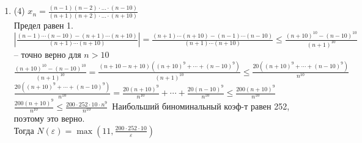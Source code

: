 \documentclass[a4paper]{article}
\def\eps{\varepsilon}
\begin{document}
\begin{enumerate}
\begin{enumerate}
        С $n > 10$ точно выполняется, что знаменатель > 1, поэтому:
        $\ 2|\frac{1 - \sqrt[3]{1 + \frac{2}{n} - \frac{1}{n^2}} + 1 - \sqrt[3]{1 - \frac{1}{n^2}} + 1 - \sqrt[3]{1 - \frac{2}{n} - \frac{1}{n^2}}}{3(\sqrt[3]{1 + \frac{2}{n} - \frac{1}{n^2}} + \sqrt[3]{1 - \frac{1}{n^2}} + \sqrt[3]{1 - \frac{2}{n} - \frac{1}{n^2}})}| \le
        2|1 - \sqrt[3]{1 + \frac{2}{n} - \frac{1}{n^2}} + 1 - \sqrt[3]{1 - \frac{1}{n^2}} + 1 - \sqrt[3]{1 - \frac{2}{n} - \frac{1}{n^2}}| \le
        2|3 - \sqrt[3]{1 + \frac{2}{n} - \frac{1}{n^2}}| \le 2|3 - \sqrt[3]{1 + \frac{2}{n} -\frac{1}{n^2}}| \le
        2|3 + \sqrt[3]{\frac{1}{n^2}}|$. $2|3 + \sqrt[3]{\frac{1}{n^2}}| < \eps \Leftrightarrow
        3 + \sqrt[3]{\frac{1}{n^2}} < \frac{\eps}{2} \Leftrightarrow \frac{1}{n^2} < (\frac{\eps}{2} - 3)^3$. При $\eps \ge \frac{3}{2}$ можно брать $n = 10$ и все будет хорошо. Дальше рассматриваем $\eps < \frac{3}{2}$
        \item (4) $x_n = \frac{(n-1)(n-2)\cdot\dots\cdot (n-10)}{(n+1)(n+2)\cdot\dots\cdot(n+10)}$\\
        Предел равен 1.\\
        $|\frac{(n-1)\cdots(n-10) - (n+1)\cdots(n+10)}{(n+1)\cdots(n+10)}| = \frac{(n+1)\cdots(n+10) - (n-1)\cdots(n-10)}{(n+1)\cdots(n+10)} \le \frac{(n+10)^{10} - (n-10)^{10}}{(n+1)^{10}}$ -- точно верно для $n > 10$\\
        $\frac{(n+10)^{10} - (n-10)^{10}}{(n+1)^{10}} = \frac{(n+10 - n + 10)((n+10)^9 + \cdots + (n-10)^9)}{(n+1)^{10}} \le \frac{20((n+10)^9 + \cdots + (n-10)^9)}{n^{10}}$\\
        $\frac{20((n+10)^9 + \cdots + (n-10)^9)}{n^{10}} = \frac{20(n+10)^9}{n^{10}} + \cdots + \frac{20(n-10)^9}{n^{10}} \le \frac{200(n+10)^9}{n^{10}}$\\
        $\frac{200(n+10)^9}{n^{10}} \le \frac{200\cdot 252 \cdot 10 \cdot n^9}{n^{10}}$\ Наибольший биноминальный коэф-т равен 252, поэтому это верно.\\
        Тогда $N(\eps) = \max(11, \frac{200\cdot 252 \cdot 10}{\eps})$    
    \end{enumerate}
    

\end{enumerate}
\end{document}

